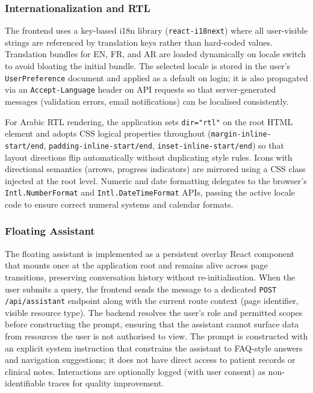 \documentclass[a4paper,12pt]{report}
\begin{document}
\subsubsection*{Internationalization and RTL}
 
The frontend uses a key-based i18n library (\texttt{react-i18next}) where all user-visible
strings are referenced by translation keys rather than hard-coded values. Translation bundles
for EN, FR, and AR are loaded dynamically on locale switch to avoid bloating the initial
bundle. The selected locale is stored in the user's \texttt{UserPreference} document and
applied as a default on login; it is also propagated via an \texttt{Accept-Language} header
on API requests so that server-generated messages (validation errors, email notifications) can
be localised consistently.
 
For Arabic RTL rendering, the application sets \texttt{dir="rtl"} on the root HTML element
and adopts CSS logical properties throughout (\texttt{margin-inline-start/end},
\texttt{padding-inline-start/end}, \texttt{inset-inline-start/end}) so that layout directions
flip automatically without duplicating style rules. Icons with directional semantics (arrows,
progress indicators) are mirrored using a CSS class injected at the root level. Numeric and
date formatting delegates to the browser's \texttt{Intl.NumberFormat} and
\texttt{Intl.DateTimeFormat} APIs, passing the active locale code to ensure correct
numeral systems and calendar formats.
 
\subsubsection*{Floating Assistant}
 
The floating assistant is implemented as a persistent overlay React component that mounts once
at the application root and remains alive across page transitions, preserving conversation
history without re-initialisation. When the user submits a query, the frontend sends the
message to a dedicated \texttt{POST /api/assistant} endpoint along with the current route
context (page identifier, visible resource type). The backend resolves the user's role and
permitted scopes before constructing the prompt, ensuring that the assistant cannot surface
data from resources the user is not authorised to view. The prompt is constructed with an
explicit system instruction that constrains the assistant to FAQ-style answers and navigation
suggestions; it does not have direct access to patient records or clinical notes. Interactions
are optionally logged (with user consent) as non-identifiable traces for quality improvement.
 
\end{document}

